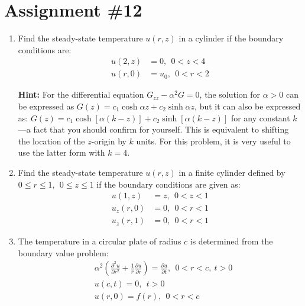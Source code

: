 \chapter{Assignment \#12}
\label{ch:ass12}
\begin{fullwidth}

\begin{enumerate}

\item Find the steady-state temperature $u(r,z)$ in a cylinder if the boundary conditions are:
\begin{align*}
u(2,z) &= 0, \ \ 0 < z < 4 \\
u(r,0) &= u_0, \ \ 0 < r < 2
\end{align*}

\noindent\textbf{Hint:} For the differential equation $G_{zz} - \alpha^2 G = 0$, the solution for $\alpha > 0$ can be expressed as $G(z) = c_1 \cosh{\alpha z} + c_2\sinh{\alpha z}$, but it can also be expressed as: $G(z) = c_1 \cosh{[\alpha(k-z)]} + c_2 \sinh{[\alpha(k-z)]}$ for any constant $k$---a fact that you should confirm for yourself.  This is equivalent to shifting the location of the $z$-origin by $k$ units.  For this problem, it is very useful to use the latter form with $k=4$.


\vspace{4.0cm}


\item Find the steady-state temperature $u(r,z)$ in a finite cylinder defined by $0 \le r \le 1, \ \ 0 \le z \le 1$ if the boundary conditions are given as:
\begin{align*}
u(1,z) &= z, \ \ 0 < z < 1 \\
u_z(r,0) &= 0, \ \ 0 < r < 1 \\
u_z(r,1) &= 0, \ \ 0 < r < 1
\end{align*}


\vspace{5.0cm}

\item The temperature in a circular plate of radius $c$ is determined from the boundary value problem:
\begin{align*}
&\alpha^2\left(\frac{\partial^2 u}{\partial r^2} + \frac{1}{r}\frac{\partial u}{\partial r} \right) = \frac{\partial u}{\partial t}, \ \ 0 < r < c, \ t>0 \\
&u(c,t) = 0, \ \ t> 0 \\
&u(r,0) = f(r), \ \ 0<r<c
\end{align*}


\end{enumerate}
\end{fullwidth}
